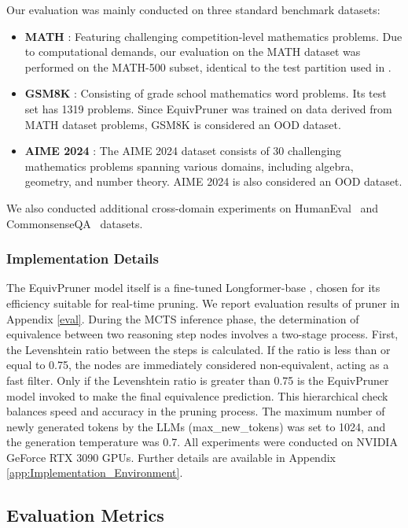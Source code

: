 \documentclass[11pt]{article}
\begin{document}
Our evaluation was mainly conducted on three standard benchmark datasets:
\begin{itemize}
\item \textbf{MATH} \citep{hendrycks2021math}: Featuring challenging competition-level mathematics problems. Due to computational demands, our evaluation on the MATH dataset was performed on the MATH-500 subset, identical to the test partition used in \citet{lightman2023let}.
\item \textbf{GSM8K} \citep{cobbe2021training}: Consisting of grade school mathematics word problems. Its test set has 1319 problems. Since EquivPruner was trained on data derived from MATH dataset problems, GSM8K is considered an OOD dataset.
\item \textbf{AIME 2024} \citep{codeforcesamerican}: The AIME 2024 dataset consists of 30 challenging mathematics problems spanning various domains, including algebra, geometry, and number theory. AIME 2024 is also considered an OOD dataset.
\end{itemize}
We also conducted additional cross-domain experiments on HumanEval~\cite{chen2021evaluating} and CommonsenseQA~\cite{talmor2019commonsenseqa} datasets.
\subsubsection{Implementation Details}
\label{subsubsec:Implementation_Details}

The EquivPruner model itself is a fine-tuned Longformer-base \citep{beltagy2020longformer}, chosen for its efficiency suitable for real-time pruning.
We report evaluation results of pruner in Appendix \ref{eval}. During the MCTS inference phase, the determination of equivalence between two reasoning step nodes involves a two-stage process. First, the Levenshtein ratio between the steps is calculated. If the ratio is less than or equal to 0.75, the nodes are immediately considered non-equivalent, acting as a fast filter. Only if the Levenshtein ratio is greater than 0.75 is the EquivPruner model invoked to make the final equivalence prediction. This hierarchical check balances speed and accuracy in the pruning process.
The maximum number of newly generated tokens by the LLMs (max\_new\_tokens) was set to 1024, and the generation temperature was 0.7.  All experiments were conducted on NVIDIA GeForce RTX 3090 GPUs. 
Further details are available in Appendix \ref{app:Implementation_Environment}.

\subsection{Evaluation Metrics}
\label{subsec:Evaluation_Metrics}
\end{document}
